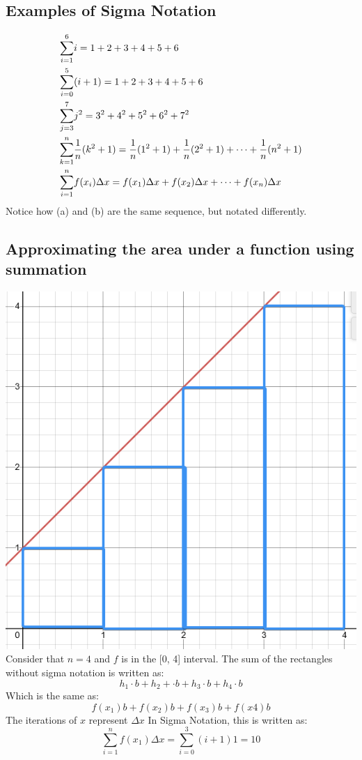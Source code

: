 \documentclass[11pt]{article}
\newcommand*{\set}{\setcounter{equation}{0}}
\begin{document}
\subsection{Examples of Sigma Notation}
\begin{align}
    \set
    \sum_{i=1}^{6}&i=1+2+3+4+5+6\\
    \sum_{i=0}^{5}&(i+1)=1+2+3+4+5+6\\
    \sum_{j=3}^{7}&j^2=3^2+4^2+5^2+6^2+7^2\\
    \sum_{k=1}^{n}&\frac{1}{n}(k^2+1)=\frac{1}{n}(1^2+1)+\frac{1}{n}(2^2+1)+\cdots+\frac{1}{n}(n^2+1)\\
    \sum_{i=1}^{n}&f(x_i)\Delta x=f(x_1)\Delta x+f(x_2)\Delta x+\cdots+f(x_n)\Delta x
\end{align}
Notice how (a) and (b) are the same sequence, but notated differently.

\subsection{Approximating the area under a function using summation}
\includegraphics{xplus1.png}\\
Consider that $n=4$ and $f$ is in the [0, 4] interval. The sum of the rectangles without sigma notation is written as:
\[h_1\cdot b+h_2+\cdot b+ h_3\cdot b+h_4\cdot b\]
Which is the same as:
\[f(x_1)b+f(x_2)b+f(x_3)b+f(x4)b\]
The iterations of $x$ represent $\Delta x$
In Sigma Notation, this is written as:
\[\sum_{i=1}^{n}f(x_1)\Delta x=\sum_{i=0}^{3}(i+1)1=10\]
\end{document}
